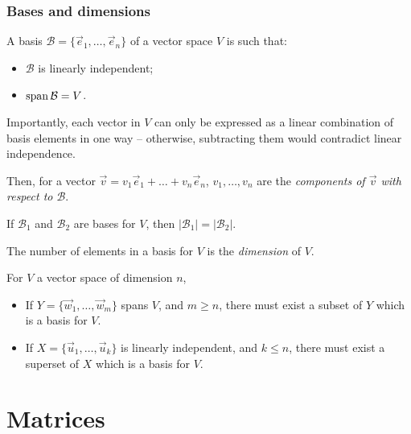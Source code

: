 \documentclass{../template/note}
\begin{document}
    \subsubsection{Bases and dimensions}
    
    \begin{definition}
        A basis \(\mathcal B = \{\vec e_1, \dots, \vec e_n\}\) of a vector space \(V\) is such that:
        \begin{itemize}
            \item \(\mathcal B\) is linearly independent;
            \item \(\operatorname{span} \mathcal B = V\).
        \end{itemize}
        Importantly, each vector in \(V\) can only be expressed as a linear combination of basis elements in one way -- otherwise, subtracting them would contradict linear independence.

        Then, for a vector \(\vec v = v_1 \vec e_1 + \dots + v_n \vec e_n\), \(v_1, \dots, v_n\) are the \emph{components of \(\vec v\) with respect to \(\mathcal B\)}.
    \end{definition}

    \begin{theorem}
        If \(\mathcal B_1\) and \(\mathcal B_2\) are bases for \(V\), then \(|\mathcal B_1| = |\mathcal B_2|\).
    \end{theorem}
    
    \begin{definition}
        The number of elements in a basis for \(V\) is the \emph{dimension} of \(V\).
    \end{definition}
    
    \begin{proposition}
        For \(V\) a vector space of dimension \(n\),
        \begin{itemize}
            \item If \(Y = \{\vec w_1, \dots, \vec w_m\}\) spans \(V\), and \(m \geq n\), there must exist a subset of \(Y\) which is a basis for \(V\).
            \item If \(X = \{\vec u_1, \dots, \vec u_k\}\) is linearly independent, and \(k \leq n\), there must exist a superset of \(X\) which is a basis for \(V\).
        \end{itemize}
    \end{proposition}

    
    \section{Matrices}
\end{document}

